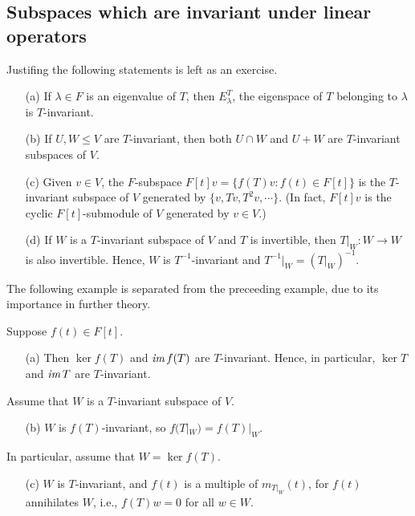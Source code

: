 \subsection{Subspaces which are invariant under linear operators}

\begin{exmp}
    Justifing the following statements is left as an exercise.
    \begin{enumerate}
        \item[(a)]
        {
            If $\lambda\in F$ is an eigenvalue of $T$, then $E_\lambda^T$, the eigenspace of $T$ belonging to $\lambda$ is $T$-invariant.
        }
        \item[(b)]
        {
            If $U, W\leq V$ are $T$-invariant, then both $U\cap W$ and $U+W$ are $T$-invariant subspaces of $V$.
        }
        \item[(c)]
        {
            Given $v\in V$, the $F$-subspace $F[t]v=\{f(T)v: f(t)\in F[t]\}$ is the $T$-invariant subspace of $V$ generated by $\{v, Tv, T^2v, \cdots\}$.
            (In fact, $F[t]v$ is the cyclic $F[t]$-submodule of $V$ generated by $v\in V$.)
        }
        \item[(d)]
        {
            If $W$ is a $T$-invariant subspace of $V$ and $T$ is invertible, then $T|_W: W\rightarrow W$ is also invertible.
            Hence, $W$ is $T^{-1}$-invariant and $T^{-1}|_W=(T|_W)^{-1}$.
        }
    \end{enumerate}    
\end{exmp}
The following example is separated from the preceeding example, due to its importance in further theory.
\begin{exmp}
    Suppose $f(t)\in F[t]$.
    \begin{enumerate}
        \item[(a)]
        {
            Then $\ker f(T)$ and $\textit{im\,} f(T)$ are $T$-invariant.
            Hence, in particular, $\ker T$ and $\textit{im\,} T$ are $T$-invariant.
        }
    \end{enumerate}
    Assume that $W$ is a $T$-invariant subspace of $V$.
    \begin{enumerate}
        \item[(b)]
        {
            $W$ is $f(T)$-invariant, so $f(T|_W)=f(T)|_W$.
        }
    \end{enumerate}
    In particular, assume that $W=\ker f(T)$.
    \begin{enumerate}
        \item[(c)]
        {
            $W$ is $T$-invariant, and $f(t)$ is a multiple of $m_{T|_W}(t)$, for $f(t)$ annihilates $W$, i.e., $f(T)w=0$ for all $w\in W$.
        }
    \end{enumerate}
\end{exmp}

